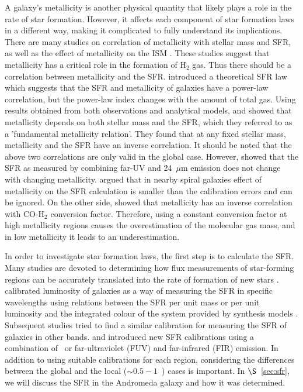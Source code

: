 A galaxy's metallicity is another physical quantity that likely plays a role in the rate of star formation. However, it affects each component of star formation laws in a different way, making it complicated to fully understand its implications. There are many studies on correlation of metallicity with stellar mass and SFR, as well as the effect of metallicity on the ISM \citep[e.g.][]{Boissier03, Leroy08, Krumholz09, Mannucci10, Dib11a, Dib11b, Lilly13}. These studies suggest that metallicity has a critical role in the formation of H$_2$ gas. Thus there should be a correlation between metallicity and the SFR. \citet{Krumholz09} introduced a theoretical SFR law which suggests that the SFR and metallicity of galaxies have a power-law correlation, but the power-law index changes with the amount of total gas. 
 Using results obtained from both observations and analytical models, \citet{Mannucci10} and \citet{Lilly13} showed that metallicity depends on both stellar mass and the SFR, which they referred to as a 'fundamental metallicity relation'. They found that at any fixed stellar mass, metallicity and the SFR have an inverse correlation. It should be noted that the above two correlations are only valid in the global case. However, \citet{Leroy08} showed that the SFR as measured by combining far-UV and 24~$\mu$m emission does not change with changing metallicity. \citet{Roychowdhury15} argued that in nearby spiral galaxies effect of metallicity on the SFR calculation is smaller than the calibration errors and can be ignored. On the other side, \citet{Boissier03} showed that metallicity has an inverse correlation with CO-H$_2$ conversion factor. Therefore, using a constant conversion factor at high metallicity regions causes the overestimation of the molecular gas mass, and in low metallicity it leads to an underestimation.


In order to investigate star formation laws, the first step is to calculate the SFR. Many studies are devoted to determining how flux measurements of star-forming regions can be accurately translated into the rate of formation of new stars \citep[e.g.][]{Zhu08, Kennicutt09, Boquien10, Boquien11, Hao11, Kennicutt12, Calzetti13}. \citet{Kennicutt98b} calibrated luminosity of galaxies as a way of measuring the SFR in specific wavelengths using relations between the SFR per unit mass or per unit luminosity and the integrated colour of the system provided by synthesis models \citep[e.g.][]{Bruzual93}. Subsequent studies tried to find a similar calibration for measuring the SFR of galaxies in other bands. \citet{Kennicutt09} and \citet{Hao11} introduced new SFR calibrations using a combination of \halpha\ or far-ultraviolet (FUV) and far-infrared (FIR) emission. In addition to using suitable calibrations for each region, considering the differences between the global and the local ($\sim 0.5-1$~\kpc) cases is important. In $\S$~\ref{sec:sfr}, we will discuss the SFR in the Andromeda galaxy and how it was determined. 


